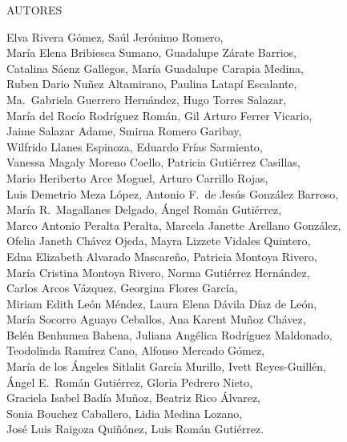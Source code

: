 \begin{scriptsize}
\noindent AUTORES

\begin{sloppypar}
\noindent \nohyphens{Elva Rivera Gómez, Saúl Jerónimo Romero,\\  María Elena Bribiesca Sumano, 
Guadalupe Zárate Barrios,\\  Catalina Sáenz Gallegos,  María Guadalupe Carapia Medina,\\
Ruben Dario Nuñez Altamirano, Paulina Latapí
Escalante,\\ Ma.\ Gabriela Guerrero Hernández,
Hugo Torres Salazar,\\
María del Rocío Rodríguez Román, Gil Arturo Ferrer Vicario,\\
Jaime Salazar Adame, Smirna Romero Garibay,\\ Wilfrido Llanes Espinoza,
Eduardo Frías Sarmiento,\\ Vanessa
Magaly Moreno Coello, Patricia Gutiérrez Casillas,\\
Mario Heriberto Arce Moguel, Arturo Carrillo
Rojas,\\ Luis Demetrio Meza López,
Antonio F.\ de Jesús González Barroso,\\
María R.\ Magallanes Delgado, Ángel
Román Gutiérrez,\\ Marco Antonio Peralta Peralta,
Marcela Janette Arellano González,\\ Ofelia
Janeth Chávez Ojeda, Mayra Lizzete Vidales Quintero,\\
Edna Elizabeth Alvarado Mascareño,
Patricia Montoya Rivero,\\ María Cristina
Montoya Rivero,  Norma Gutiérrez Hernández,\\ Carlos
Arcos Vázquez, Georgina Flores García,\\
Miriam  Edith León Méndez,
Laura Elena Dávila Díaz de León,\\ María Socorro
Aguayo Ceballos, Ana Karent Muñoz Chávez,\\ Belén Benhumea Bahena, Juliana
Angélica Rodríguez Maldonado,\\ Teodolinda Ramírez Cano,
Alfonso Mercado Gómez,\\ María de los Ángeles
Sitlalit García Murillo, Ivett Reyes-Guillén,\\ Ángel E.\
Román Gutiérrez, Gloria Pedrero Nieto,\\ Graciela Isabel Badía
Muñoz, Beatriz Rico Álvarez,\\ Sonia Bouchez Caballero, Lidia Medina Lozano,\\ José Luis Raigoza Quiñónez,
Luis Román Gutiérrez.}
\end{sloppypar}
\end{scriptsize}

